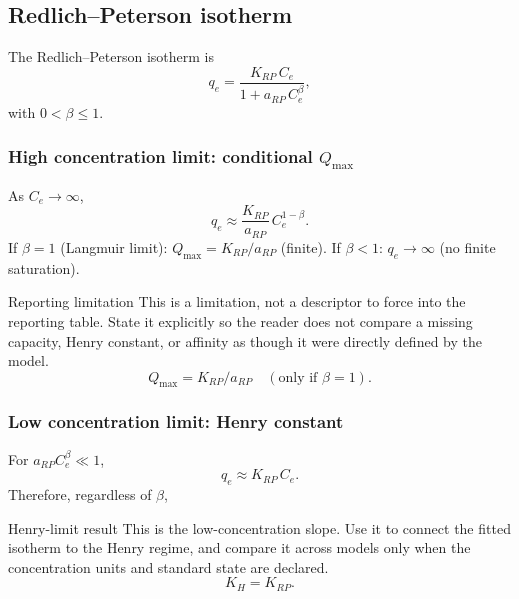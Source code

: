 \documentclass[journal=jacsat,manuscript=article]{achemso}
\begin{document}
\subsection{Redlich--Peterson isotherm}
\label{sec:si_redlich_peterson}

The Redlich--Peterson isotherm is
\begin{equation}
	q_e = \frac{K_{RP}\, C_e}{1 + a_{RP}\, C_e^{\beta}},
	\label{eq:si_redlich_peterson}
\end{equation}
with $0 < \beta \leq 1$.

\subsubsection{High concentration limit: conditional $Q_{\max}$}

As $C_e \to \infty$,
\begin{equation}
	q_e \approx \frac{K_{RP}}{a_{RP}}\, C_e^{1-\beta}.
\end{equation}
If $\beta = 1$ (Langmuir limit): $Q_{\max} = K_{RP}/a_{RP}$ (finite).
If $\beta < 1$: $q_e \to \infty$ (no finite saturation).
\begin{redbox}{Reporting limitation}
	This is a limitation, not a descriptor to force into the reporting table. State it explicitly so the reader does not compare a missing capacity, Henry constant, or affinity as though it were directly defined by the model.
\begin{equation}
	Q_{\max} = K_{RP}/a_{RP} \quad (\text{only if } \beta = 1).
\end{equation}
\end{redbox}

\subsubsection{Low concentration limit: Henry constant}

For $a_{RP}C_e^{\beta} \ll 1$,
\begin{equation}
	q_e \approx K_{RP}\, C_e.
\end{equation}
Therefore, regardless of $\beta$,
\begin{greenbox}{Henry-limit result}
	This is the low-concentration slope. Use it to connect the fitted isotherm to the Henry regime, and compare it across models only when the concentration units and standard state are declared.
\begin{equation}
	K_H = K_{RP}.
\end{equation}
\end{greenbox}
\end{document}
